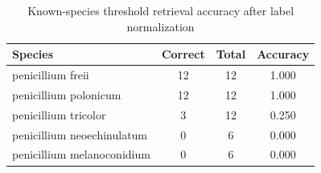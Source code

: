 \begin{table}[ht]
\centering
\caption{Known-species threshold retrieval accuracy after label normalization}
\label{tab:threshold_known_species}
\begin{tabular}{@{}lccc@{}}
\toprule
Species & Correct & Total & Accuracy \\
\midrule
penicillium freii & 12 & 12 & 1.000 \\
penicillium polonicum & 12 & 12 & 1.000 \\
penicillium tricolor & 3 & 12 & 0.250 \\
penicillium neoechinulatum & 0 & 6 & 0.000 \\
penicillium melanoconidium & 0 & 6 & 0.000 \\
\bottomrule
\end{tabular}
\end{table}
